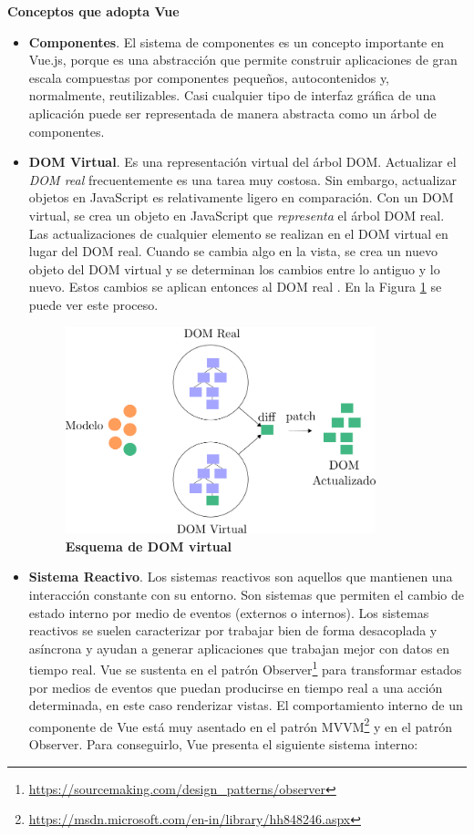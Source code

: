 \vspace{5mm}
\textbf{Conceptos que adopta Vue}
\begin{itemize}

    \item \textbf{Componentes}. El sistema de componentes es un concepto importante en Vue.js, porque es una abstracción que permite construir aplicaciones de gran escala compuestas por componentes pequeños, autocontenidos y, normalmente, reutilizables. Casi cualquier tipo de interfaz gráfica de una aplicación puede ser representada de manera abstracta como un árbol de componentes. 
    
    \item \textbf{DOM Virtual}. Es una representación virtual del árbol DOM. Actualizar el \textit{DOM real} frecuentemente es una tarea muy costosa. Sin embargo, actualizar objetos en JavaScript es relativamente ligero en comparación. Con un DOM virtual, se crea un objeto en JavaScript que \textit{representa} el árbol DOM real. Las actualizaciones de cualquier elemento se realizan en el DOM virtual en lugar del DOM real. Cuando se cambia algo en la vista, se crea un nuevo objeto del DOM virtual y se determinan los cambios  entre lo antiguo y lo nuevo. Estos cambios se aplican entonces al DOM real . En la Figura \ref{fig:sistema1} se puede ver este proceso.
    \begin{figure}[h]
    \includegraphics[width=9cm]{Img/Desarrollo/sistema1.png}
    \centering
    \caption{\textbf{ \footnotesize{Esquema de DOM virtual}}}
     \label{fig:sistema1}
    \end{figure}
    
    \item \textbf{Sistema Reactivo}. Los sistemas reactivos son aquellos que mantienen una interacción constante con su entorno. Son sistemas que permiten el cambio de estado interno por medio de eventos (externos o internos).
    Los sistemas reactivos se suelen caracterizar por trabajar bien de forma desacoplada y asíncrona y ayudan a generar aplicaciones que trabajan mejor con datos en tiempo real. Vue se sustenta en el patrón Observer\footnote{\url{https://sourcemaking.com/design_patterns/observer}} para transformar estados por medios de eventos que puedan producirse en tiempo real a una acción determinada, en este caso renderizar vistas.
    El comportamiento interno de un componente de Vue está muy asentado en el patrón MVVM\footnote{\url{https://msdn.microsoft.com/en-in/library/hh848246.aspx}} y en el patrón Observer. Para conseguirlo, Vue presenta el siguiente sistema interno:
    

\end{itemize}
